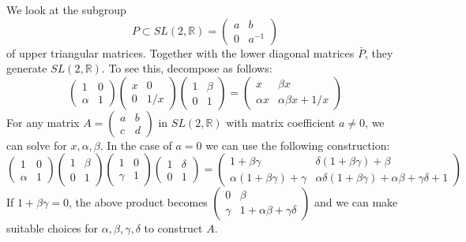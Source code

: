 \documentclass[
]{article}
\theoremstyle{break}
\theoremstyle{plain}
\begin{document}
We look at the subgroup
\[P \subset SL(2, \mathbb{R}) = \begin{pmatrix}a & b \\ 0 & a^{-1}\end{pmatrix}\]
of upper triangular matrices. Together with the lower diagonal matrices
$\bar{P}$, they generate $SL(2, \mathbb{R})$. To see this, decompose
as follows: \[\begin{pmatrix}1&0\\\alpha&1\end{pmatrix}
\begin{pmatrix}x&0\\0&1/x\end{pmatrix}
\begin{pmatrix}1&\beta\\0&1\end{pmatrix} = 
\begin{pmatrix} x&\beta x\\\alpha x& \alpha\beta x+1/x\end{pmatrix}\]
For any matrix $A = \begin{pmatrix}a & b \\ c & d\end{pmatrix}$ in
$SL(2, \mathbb{R})$ with matrix coefficient $a \neq 0$, we can solve
for $x,\alpha, \beta$. In the case of $a = 0$ we can use the
following construction:
\[
  \begin{pmatrix} 1&0\\\alpha&1\end{pmatrix}
  \begin{pmatrix} 1&\beta\\0&1\end{pmatrix}
  \begin{pmatrix} 1&0\\\gamma&1\end{pmatrix}
  \begin{pmatrix} 1&\delta\\0&1\end{pmatrix}=
  \begin{pmatrix}
    1+\beta\gamma&\delta(1+\beta\gamma)+\beta\\
    \alpha(1+\beta\gamma)+\gamma&\alpha\delta(1+\beta\gamma)+\alpha\beta+\gamma\delta+1
  \end{pmatrix}
\]
If $1 + \beta\gamma = 0$, the above product becomes
$\begin{pmatrix} 0&\beta\\ \gamma& 1+\alpha\beta+\gamma\delta \end{pmatrix}$
and we can make suitable choices for $\alpha, \beta, \gamma, \delta$
to construct $A$.
\end{document}
